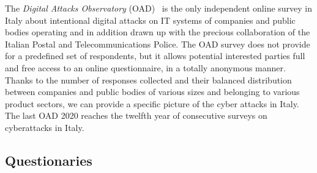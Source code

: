 \documentclass{easychair}
\begin{document}
The \textit{Digital Attacks Observatory} (OAD)~\cite{oadweb} is the only independent online survey in Italy about intentional digital attacks on IT systems of companies and public
bodies operating and in addition drawn up with the precious collaboration of the Italian Postal and Telecommunications Police. The OAD survey does not provide 
for a predefined set of respondents, but it allows potential interested parties full and free access to an online questionnaire, in a totally anonymous manner. 
Thanks to the number of responses collected and their balanced distribution between companies and public bodies of various sizes and belonging to various product 
sectors, we can provide a specific picture of the cyber attacks in Italy.  The last OAD 2020  reaches the twelfth year of consecutive surveys on cyberattacks in Italy.

\subsection{Questionaries}
\end{document}
